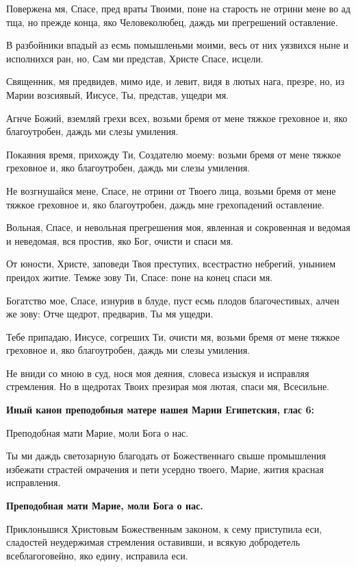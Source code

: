 Повержена мя, Спасе, пред враты Твоими, поне на старость не отрини мене во ад тща, но прежде конца, яко Человеколюбец, даждь ми прегрешений оставление.


В разбойники впадый аз есмь помышленьми моими, весь от них уязвихся ныне и исполнихся ран, но, Сам ми представ, Христе Спасе, исцели.


Священник, мя предвидев, мимо иде, и левит, видя в лютых нага, презре, но, из Марии возсиявый, Иисусе, Ты, представ, ущедри мя.


Агнче Божий, вземляй грехи всех, возьми бремя от мене тяжкое греховное и, яко благоутробен, даждь ми слезы умиления.


Покаяния время, прихожду Ти, Создателю моему: возьми бремя от мене тяжкое греховное и, яко благоутробен, даждь ми слезы умиления.


Не возгнушайся мене, Спасе, не отрини от Твоего лица, возьми бремя от мене тяжкое греховное и, яко благоутробен, даждь мне грехопадений оставление.


Вольная, Спасе, и невольная прегрешения моя, явленная и сокровенная и ведомая и неведомая, вся простив, яко Бог, очисти и спаси мя.


От юности, Христе, заповеди Твоя преступих, всестрастно небрегий, унынием преидох житие. Темже зову Ти, Спасе: поне на конец спаси мя.


Богатство мое, Спасе, изнурив в блуде, пуст есмь плодов благочестивых, алчен же зову: Отче щедрот, предварив, Ты мя ущедри.


Тебе припадаю, Иисусе, согреших Ти, очисти мя, возьми бремя от мене тяжкое греховное и, яко благоутробен, даждь ми слезы умиления.


Не вниди со мною в суд, нося моя деяния, словеса изыскуя и исправляя стремления. Но в щедротах Твоих презирая моя лютая, спаси мя, Всесильне.


\medskip
\bfseries Иный канон преподобныя матере нашея Марии Египетския, глас 6:\normalfont{}


Преподобная мати Марие, моли Бога о нас.


Ты ми даждь светозарную благодать от Божественнаго свыше промышления избежати страстей омрачения и пети усердно твоего, Марие, жития красная исправления.


\bfseries Преподобная мати Марие, моли Бога о нас.\normalfont{}


Приклоньшися Христовым Божественным законом, к сему приступила еси, сладостей неудержимая стремления оставивши, и всякую добродетель всеблагоговейно, яко едину, исправила еси.



